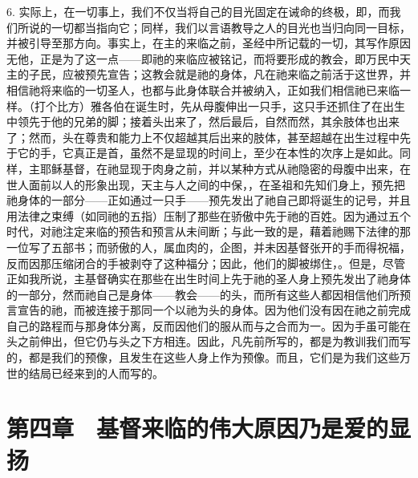 6. 实际上，在一切事上，我们不仅当将自己的目光固定在诫命的终极，即，而我们所说的一切都当指向它；同样，我们以言语教导之人的目光也当归向同一目标，并被引导至那方向。事实上，在主的来临之前，圣经中所记载的一切，其写作原因无他，正是为了这一点——即祂的来临应被铭记，而将要形成的教会，即万民中天主的子民，应被预先宣告；这教会就是祂的身体，凡在祂来临之前活于这世界，并相信祂将来临的一切圣人，也都与此身体联合并被纳入，正如我们相信祂已来临一样。（打个比方）雅各伯在诞生时，先从母腹伸出一只手，这只手还抓住了在出生中领先于他的兄弟的脚；接着头出来了，然后最后，自然而然，其余肢体也出来了；然而，头在尊贵和能力上不仅超越其后出来的肢体，甚至超越在出生过程中先于它的手，它真正是首，虽然不是显现的时间上，至少在本性的次序上是如此。同样，主耶稣基督，在祂显现于肉身之前，并以某种方式从祂隐密的母腹中出来，在世人面前以人的形象出现，天主与人之间的中保，，在圣祖和先知们身上，预先把祂身体的一部分——正如通过一只手——预先发出了祂自己即将诞生的记号，并且用法律之束缚（如同祂的五指）压制了那些在骄傲中先于祂的百姓。因为通过五个时代，对祂注定来临的预告和预言从未间断；与此一致的是，藉着祂赐下法律的那一位写了五部书；而骄傲的人，属血肉的，企图，并未因基督张开的手而得祝福，反而因那压缩闭合的手被剥夺了这种福分；因此，他们的脚被绑住，。但是，尽管正如我所说，主基督确实在那些在出生时间上先于祂的圣人身上预先发出了祂身体的一部分，然而祂自己是身体——教会——的头，而所有这些人都因相信他们所预言宣告的祂，而被连接于那同一个以祂为头的身体。因为他们没有因在祂之前完成自己的路程而与那身体分离，反而因他们的服从而与之合而为一。因为手虽可能在头之前伸出，但它仍与头之下方相连。因此，凡先前所写的，都是为教训我们而写的，都是我们的预像，且发生在这些人身上作为预像。而且，它们是为我们这些万世的结局已经来到的人而写的。\par


\section{第四章　基督来临的伟大原因乃是爱的显扬}

